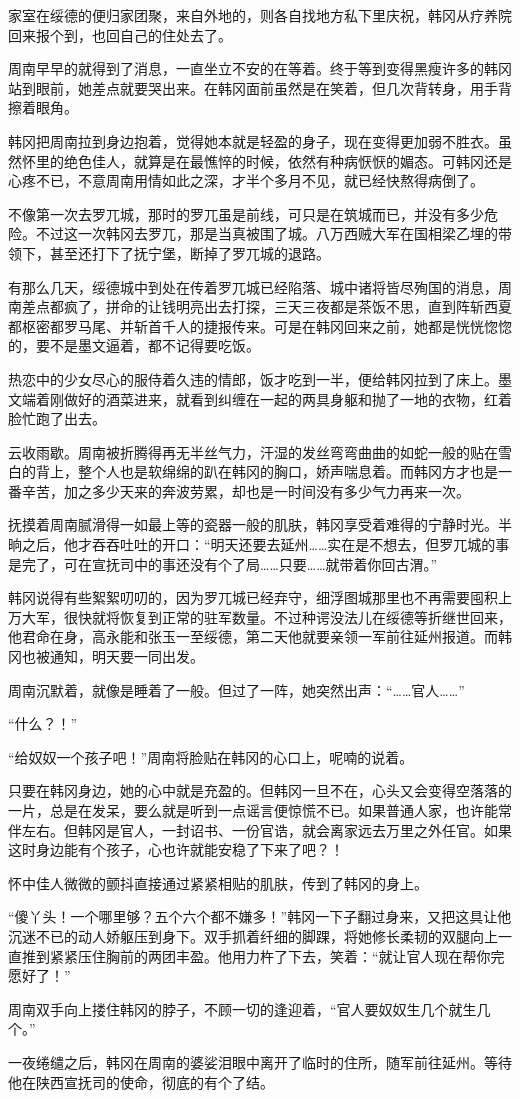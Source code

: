 家室在绥德的便归家团聚，来自外地的，则各自找地方私下里庆祝，韩冈从疗养院回来报个到，也回自己的住处去了。

周南早早的就得到了消息，一直坐立不安的在等着。终于等到变得黑瘦许多的韩冈站到眼前，她差点就要哭出来。在韩冈面前虽然是在笑着，但几次背转身，用手背擦着眼角。

韩冈把周南拉到身边抱着，觉得她本就是轻盈的身子，现在变得更加弱不胜衣。虽然怀里的绝色佳人，就算是在最憔悴的时候，依然有种病恹恹的媚态。可韩冈还是心疼不已，不意周南用情如此之深，才半个多月不见，就已经快熬得病倒了。

不像第一次去罗兀城，那时的罗兀虽是前线，可只是在筑城而已，并没有多少危险。不过这一次韩冈去罗兀，那是当真被围了城。八万西贼大军在国相梁乙埋的带领下，甚至还打下了抚宁堡，断掉了罗兀城的退路。

有那么几天，绥德城中到处在传着罗兀城已经陷落、城中诸将皆尽殉国的消息，周南差点都疯了，拼命的让钱明亮出去打探，三天三夜都是茶饭不思，直到阵斩西夏都枢密都罗马尾、并斩首千人的捷报传来。可是在韩冈回来之前，她都是恍恍惚惚的，要不是墨文逼着，都不记得要吃饭。

热恋中的少女尽心的服侍着久违的情郎，饭才吃到一半，便给韩冈拉到了床上。墨文端着刚做好的酒菜进来，就看到纠缠在一起的两具身躯和抛了一地的衣物，红着脸忙跑了出去。

云收雨歇。周南被折腾得再无半丝气力，汗湿的发丝弯弯曲曲的如蛇一般的贴在雪白的背上，整个人也是软绵绵的趴在韩冈的胸口，娇声喘息着。而韩冈方才也是一番辛苦，加之多少天来的奔波劳累，却也是一时间没有多少气力再来一次。

抚摸着周南腻滑得一如最上等的瓷器一般的肌肤，韩冈享受着难得的宁静时光。半晌之后，他才吞吞吐吐的开口：“明天还要去延州……实在是不想去，但罗兀城的事是完了，可在宣抚司中的事还没有个了局……只要……就带着你回古渭。”

韩冈说得有些絮絮叨叨的，因为罗兀城已经弃守，细浮图城那里也不再需要囤积上万大军，很快就将恢复到正常的驻军数量。不过种谔没法儿在绥德等折继世回来，他君命在身，高永能和张玉一至绥德，第二天他就要亲领一军前往延州报道。而韩冈也被通知，明天要一同出发。

周南沉默着，就像是睡着了一般。但过了一阵，她突然出声：“……官人……”

“什么？！”

“给奴奴一个孩子吧！”周南将脸贴在韩冈的心口上，呢喃的说着。

只要在韩冈身边，她的心中就是充盈的。但韩冈一旦不在，心头又会变得空落落的一片，总是在发呆，要么就是听到一点谣言便惊慌不已。如果普通人家，也许能常伴左右。但韩冈是官人，一封诏书、一份官诰，就会离家远去万里之外任官。如果这时身边能有个孩子，心也许就能安稳了下来了吧？！

怀中佳人微微的颤抖直接通过紧紧相贴的肌肤，传到了韩冈的身上。

“傻丫头！一个哪里够？五个六个都不嫌多！”韩冈一下子翻过身来，又把这具让他沉迷不已的动人娇躯压到身下。双手抓着纤细的脚踝，将她修长柔韧的双腿向上一直推到紧紧压住胸前的两团丰盈。他用力杵了下去，笑着：“就让官人现在帮你完愿好了！”

周南双手向上搂住韩冈的脖子，不顾一切的逢迎着，“官人要奴奴生几个就生几个。”

一夜绻缱之后，韩冈在周南的婆娑泪眼中离开了临时的住所，随军前往延州。等待他在陕西宣抚司的使命，彻底的有个了结。


